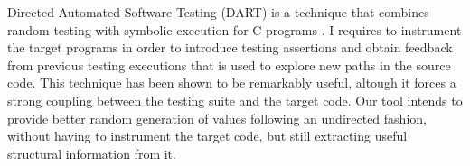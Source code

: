 %
%
Directed Automated Software Testing (DART) is a technique that combines random
testing with symbolic execution for C programs \cite{godefroid2005dart}.
%
I requires to instrument the target programs in order to introduce testing
assertions and obtain feedback from previous testing executions that is used to
explore new paths in the source code.
%
This technique has been shown to be remarkably useful, altough it forces a
strong coupling between the testing suite and the target code.
%
Our tool intends to provide better random generation of values following an
undirected fashion, without having to instrument the target code, but still
extracting useful structural information from it.
